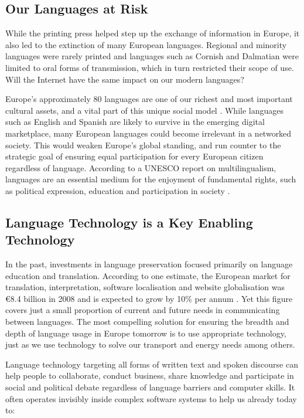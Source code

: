 \begin{multicols}{2}
\subsection{Our Languages at Risk}

While the printing press helped step up the exchange of information in Europe, it also led to the extinction of many European languages. Regional and minority languages were rarely printed and languages such as Cornish and Dalmatian were limited to oral forms of transmission, which in turn restricted their scope of use. Will the Internet have the same impact on our modern languages?


Europe’s approximately 80 languages are one of our richest and most important cultural assets, and a vital part of this unique social model \cite{EC2}. While languages such as English and Spanish are likely to survive in the emerging digital marketplace, many European languages could become irrelevant in a networked society. This would weaken Europe’s global standing, and run counter to the strategic goal of ensuring equal participation for every European citizen regardless of language. According to a UNESCO report on multilingualism, languages are an essential medium for the enjoyment of fundamental rights, such as political expression, education and participation in society \cite{Unesco1}.

\subsection{Language Technology is a Key Enabling Technology}

In the past, investments in language preservation focused primarily on language education and translation. According to one estimate, the European market for translation, interpretation, software localisation and website globalisation was €8.4 billion in 2008 and is expected to grow by 10\% per annum \cite{EC3}. Yet this figure covers just a small proportion of current and future needs in communicating between languages. The most compelling solution for ensuring the breadth and depth of language usage in Europe tomorrow is to use appropriate technology, just as we use technology to solve our transport and energy needs among others.

Language technology targeting all forms of written text and spoken discourse can help people to collaborate, conduct business, share knowledge and participate in social and political debate regardless of language barriers and computer skills. It often operates invisibly inside complex software systems to help us already today to:


\end{multicols}
